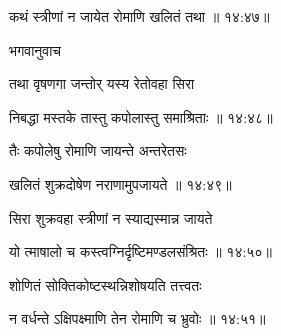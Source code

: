 {\devanagarifont कथं स्त्रीणां न जायेत रोमाणि खलितं तथा {॥ १४:४७॥} \veg\dontdisplaylinenum }%
 
{\devanagarifont भगवानुवाच {\dandab}\dontdisplaylinenum  }%
 
{\devanagarifont तथा वृषणगा जन्तोर् यस्य रेतोवहा सिरा \thinspace{\danda} \dontdisplaylinenum }%


{\devanagarifont निबद्धा मस्तके तास्तु कपोलास्तु समाश्रिताः {॥ १४:४८॥} \veg\dontdisplaylinenum }%

{\devanagarifont तैः कपोलेषु रोमाणि जायन्ते अन्तरेतसः \thinspace{\dandab} \dontdisplaylinenum }%


{\devanagarifont खलितं शुक्रदोषेण नराणामुपजायते {॥ १४:४९॥} \veg\dontdisplaylinenum }%
 
{\devanagarifont सिरा शुक्रवहा स्त्रीणां न स्याद्यस्मान्न जायते \thinspace{\dandab} \dontdisplaylinenum }%


{\devanagarifont यो त्माषालो च कस्त्वग्निर्दृष्टिमण्डलसंश्रितः {॥ १४:५०॥} \veg\dontdisplaylinenum }%

{\devanagarifont शोणितं सोक्तिकोष्टस्थन्निशोषयति तत्त्वतः \thinspace{\dandab} \dontdisplaylinenum }%


{\devanagarifont न वर्धन्ते ऽक्षिपक्ष्माणि तेन रोमाणि च भ्रुवोः {॥ १४:५१॥} \veg\dontdisplaylinenum }%


